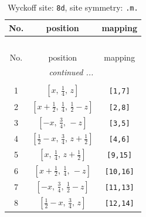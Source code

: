 \documentclass[fleqn,8pt]{jsarticle}
\begin{document}
\begin{longtable}{ccc}
\caption{Wyckoff site: {\tt 8d}, site symmetry: {\tt .m.}}
 \\
 \hline \hline
No. & position & mapping \\ \hline \endfirsthead

\multicolumn{2}{l}{\tablename\ \thetable{}} \\
 \hline \hline
No. & position & mapping \\ \hline \endhead

 \hline \hline
\multicolumn{2}{r}{\footnotesize\it continued ...} \\ \endfoot

 \hline \hline
\multicolumn{2}{r}{} \\ \endlastfoot

1 & $\left[ x,\, \frac{1}{4},\, z \right]$ & {\tt [1,7]} \\ \hline
2 & $\left[ x + \frac{1}{2},\, \frac{1}{4},\, \frac{1}{2} - z \right]$ & {\tt [2,8]} \\ \hline
3 & $\left[ - x,\, \frac{3}{4},\, - z \right]$ & {\tt [3,5]} \\ \hline
4 & $\left[ \frac{1}{2} - x,\, \frac{3}{4},\, z + \frac{1}{2} \right]$ & {\tt [4,6]} \\ \hline
5 & $\left[ x,\, \frac{1}{4},\, z + \frac{1}{2} \right]$ & {\tt [9,15]} \\ \hline
6 & $\left[ x + \frac{1}{2},\, \frac{1}{4},\, - z \right]$ & {\tt [10,16]} \\ \hline
7 & $\left[ - x,\, \frac{3}{4},\, \frac{1}{2} - z \right]$ & {\tt [11,13]} \\ \hline
8 & $\left[ \frac{1}{2} - x,\, \frac{3}{4},\, z \right]$ & {\tt [12,14]} \\
\end{longtable}
\renewcommand{\arraystretch}{1.2}
\end{document}
